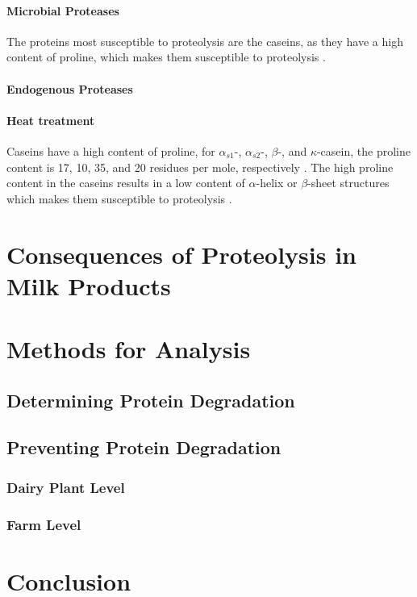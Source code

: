 \paragraph*{Microbial Proteases}
    The proteins most susceptible to proteolysis are the caseins, as they have a high content of proline, which makes them susceptible to proteolysis \cite*{b03_milk_proteins}.

\paragraph*{Endogenous Proteases}
    

\paragraph*{Heat treatment}
Caseins have a high content of proline, for $\alpha_{s1}$-, $\alpha_{s2}$-, $\beta$-, and $\kappa$-casein, the proline content is 17, 10, 35, and 20 residues per mole, respectively \cite*{b03_milk_proteins}. The high proline content in the caseins results in a low content of $\alpha$-helix or $\beta$-sheet structures which makes them susceptible to proteolysis \cite*{b03_milk_proteins}.



\section{Consequences of Proteolysis in Milk Products}


\section{Methods for Analysis}

\subsection{Determining Protein Degradation}

\subsection{Preventing Protein Degradation}

\subsubsection{Dairy Plant Level}

\subsubsection{Farm Level}



\section{Conclusion}

